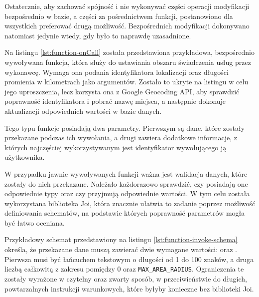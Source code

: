 Ostatecznie, aby zachować spójność i nie wykonywać części operacji modyfikacji bezpośrednio w bazie, a części za pośrednictwem funkcji, postanowiono dla wszystkich preferować drugą możliwość. Bezpośrednich modyfikacji dokonywano natomiast jedynie wtedy, gdy było to naprawdę uzasadnione.

Na listingu \ref{lst:function-onCall} została przedstawiona przykładowa, bezpośrednio wywoływana funkcja, która służy do ustawiania obszaru świadczenia usług przez wykonawcę. Wymaga ona podania identyfikatora lokalizacji oraz długości promienia w kilometrach jako argumentów. Zostało to ukryte na listingu w celu jego uproszczenia, lecz korzysta ona z Google Geocoding API, aby sprawdzić poprawność identyfikatora i pobrać nazwę miejsca, a następnie dokonuje aktualizacji odpowiednich wartości w bazie danych.

\begin{minipage}{\linewidth}

\end{minipage}

Tego typu funkcje posiadają dwa parametry. Pierwszym są dane, które zostały przekazane podczas ich wywołania, a drugi zawiera dodatkowe informacje, z których najczęściej wykorzystywanym jest identyfikator wywołującego ją użytkownika.

W przypadku jawnie wywoływanych funkcji ważna jest walidacja danych, które zostały do nich przekazane. Należało każdorazowo sprawdzić, czy posiadają one odpowiednie typy oraz czy przyjmują odpowiednie wartości. W tym celu została wykorzystana biblioteka Joi, która znacznie ułatwia to zadanie poprzez możliwość definiowania schematów, na podstawie których poprawność parametrów mogła być łatwo oceniana.

Przykładowy schemat przedstawiony na listingu \ref{lst:function-invoke-schema} określa, że przekazane dane muszą zawierać dwie wymagane wartości:  oraz . Pierwsza musi być łańcuchem tekstowym o długości od 1 do 100 znaków, a druga liczbą całkowitą z zakresu pomiędzy 0 oraz \verb|MAX_AREA_RADIUS|. Ograniczenia te zostały wyrażone w czytelny oraz zwarty sposób, w przeciwieństwie do długich, powtarzalnych instrukcji warunkowych, które byłyby konieczne bez biblioteki Joi.

\begin{minipage}{\linewidth}

\end{minipage}

